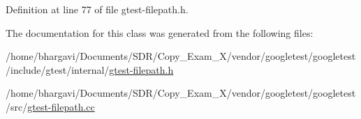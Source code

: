 Definition at line 77 of file gtest-\/filepath.\+h.



The documentation for this class was generated from the following files\+:\begin{DoxyCompactItemize}
\item 
/home/bhargavi/\+Documents/\+S\+D\+R/\+Copy\+\_\+\+Exam\+\_\+X/vendor/googletest/googletest/include/gtest/internal/\hyperlink{gtest-filepath_8h}{gtest-\/filepath.\+h}\item 
/home/bhargavi/\+Documents/\+S\+D\+R/\+Copy\+\_\+\+Exam\+\_\+X/vendor/googletest/googletest/src/\hyperlink{gtest-filepath_8cc}{gtest-\/filepath.\+cc}\end{DoxyCompactItemize}
